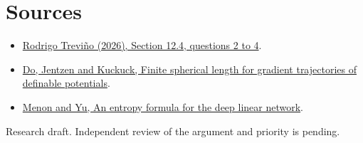 \documentclass[10pt]{article}
\begin{document}
\section*{Sources}
\begin{itemize}
\item \href{https://arxiv.org/abs/2610.05551}{Rodrigo Treviño (2026), Section 12.4, questions 2 to 4}.
\item \href{https://arxiv.org/abs/2610.29211}{Do, Jentzen and Kuckuck, Finite spherical length for gradient trajectories of definable potentials}.
\item \href{https://arxiv.org/abs/2509.09088}{Menon and Yu, An entropy formula for the deep linear network}.
\end{itemize}
{\small Research draft. Independent review of the argument and priority is pending.}
\end{document}
